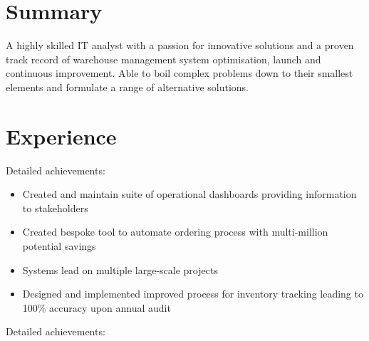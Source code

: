\documentclass[11pt,a4paper]{moderncv}
\begin{document}
\makecvtitle

\section{Summary}
A highly skilled IT analyst with a passion for innovative solutions and a proven track record of warehouse management system optimisation, launch and continuous improvement. Able to boil complex problems down to their smallest elements and formulate a range of alternative solutions.

\section{Experience}
Detailed achievements:%
\begin{itemize}
    \item Created and maintain suite of operational dashboards providing information to stakeholders
    \item Created bespoke tool to automate ordering process with multi-million potential savings
    \item Systems lead on multiple large-scale projects
    \item Designed and implemented improved process for inventory tracking leading to 100\% accuracy upon annual audit
\end{itemize}
Detailed achievements:%
\end{document}
